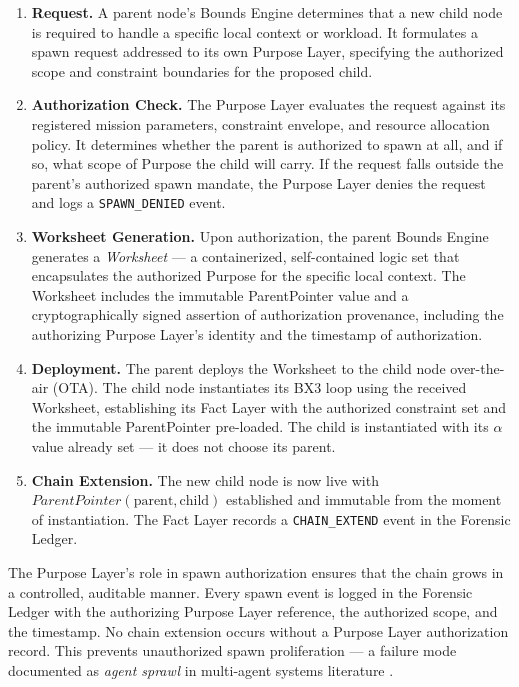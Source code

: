 \begin{enumerate}[noitemsep]
    \item \textbf{Request.} A parent node's Bounds Engine determines that a new child node is required to handle a specific local context or workload. It formulates a spawn request addressed to its own Purpose Layer, specifying the authorized scope and constraint boundaries for the proposed child.
    \item \textbf{Authorization Check.} The Purpose Layer evaluates the request against its registered mission parameters, constraint envelope, and resource allocation policy. It determines whether the parent is authorized to spawn at all, and if so, what scope of Purpose the child will carry. If the request falls outside the parent's authorized spawn mandate, the Purpose Layer denies the request and logs a \texttt{SPAWN\_DENIED} event.
    \item \textbf{Worksheet Generation.} Upon authorization, the parent Bounds Engine generates a \textit{Worksheet} — a containerized, self-contained logic set that encapsulates the authorized Purpose for the specific local context. The Worksheet includes the immutable ParentPointer value and a cryptographically signed assertion of authorization provenance, including the authorizing Purpose Layer's identity and the timestamp of authorization.
    \item \textbf{Deployment.} The parent deploys the Worksheet to the child node over-the-air (OTA). The child node instantiates its BX3 loop using the received Worksheet, establishing its Fact Layer with the authorized constraint set and the immutable ParentPointer pre-loaded. The child is instantiated with its $\alpha$ value already set — it does not choose its parent.
    \item \textbf{Chain Extension.} The new child node is now live with $\textit{ParentPointer}(\text{parent}, \text{child})$ established and immutable from the moment of instantiation. The Fact Layer records a \texttt{CHAIN\_EXTEND} event in the Forensic Ledger.
\end{enumerate}

The Purpose Layer's role in spawn authorization ensures that the chain grows in a controlled, auditable manner. Every spawn event is logged in the Forensic Ledger with the authorizing Purpose Layer reference, the authorized scope, and the timestamp. No chain extension occurs without a Purpose Layer authorization record. This prevents unauthorized spawn proliferation — a failure mode documented as \textit{agent sprawl} in multi-agent systems literature \cite{moore2025hmas}.

